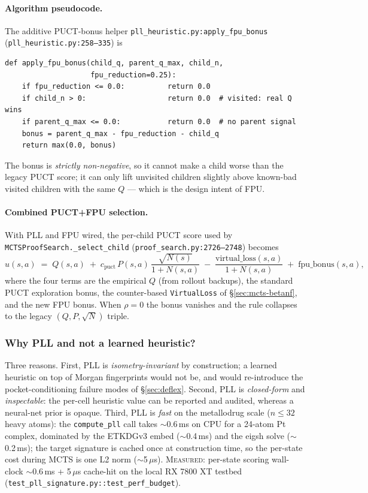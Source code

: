\paragraph{Algorithm pseudocode.}
The additive PUCT-bonus helper
\texttt{pll\_heuristic.py:apply\_fpu\_bonus}
(\texttt{pll\_heuristic.py:258--335}) is
\begin{verbatim}
def apply_fpu_bonus(child_q, parent_q_max, child_n,
                    fpu_reduction=0.25):
    if fpu_reduction <= 0.0:          return 0.0
    if child_n > 0:                   return 0.0  # visited: real Q wins
    if parent_q_max <= 0.0:           return 0.0  # no parent signal
    bonus = parent_q_max - fpu_reduction - child_q
    return max(0.0, bonus)
\end{verbatim}
The bonus is \emph{strictly non-negative}, so it cannot make
a child worse than the legacy PUCT score; it can only lift
unvisited children slightly above known-bad visited children
with the same $Q$ --- which is the design intent of FPU.

\paragraph{Combined PUCT+FPU selection.}
With PLL and FPU wired, the per-child PUCT score used by
\texttt{MCTSProofSearch.\_select\_child}
(\texttt{proof\_search.py:2726--2748}) becomes
\begin{equation}
  \label{eq:puct-fpu}
  u(s, a) \;=\; Q(s, a)
              \;+\; c_{\mathrm{puct}}\,
                  P(s, a)\,\frac{\sqrt{N(s)}}{1 + N(s, a)}
              \;-\; \frac{\mathrm{virtual\_loss}(s, a)}{1 + N(s, a)}
              \;+\; \mathrm{fpu\_bonus}(s, a),
\end{equation}
where the four terms are the empirical $Q$ (from rollout
backups), the standard PUCT exploration bonus, the
counter-based \texttt{VirtualLoss} of \S\ref{sec:mcts-betanf},
and the new FPU bonus.  When $\rho = 0$ the bonus vanishes
and the rule collapses to the legacy $(Q, P, \sqrt{N})$
triple.

\subsubsection{Why PLL and not a learned heuristic?}
\label{sec:pll-why}

Three reasons.  First, PLL is \emph{isometry-invariant} by
construction; a learned heuristic on top of Morgan fingerprints
would not be, and would re-introduce the pocket-conditioning
failure modes of \S\ref{sec:deflex}.  Second, PLL is
\emph{closed-form} and \emph{inspectable}: the per-cell
heuristic value can be reported and audited, whereas a
neural-net prior is opaque.  Third, PLL is \emph{fast} on the
metallodrug scale ($n \le 32$ heavy atoms): the
\texttt{compute\_pll} call takes $\sim$0.6\,ms on CPU for a
24-atom Pt complex, dominated by the ETKDGv3 embed
($\sim$0.4\,ms) and the eigsh solve ($\sim$0.2\,ms); the
target signature is cached once at construction time, so the
per-state cost during MCTS is one L2 norm ($\sim$5\,$\mu$s).
\textsc{Measured}: per-state scoring wall-clock
$\sim$0.6\,ms + 5\,$\mu$s cache-hit on the local RX 7800 XT
testbed (\texttt{test\_pll\_signature.py::test\_perf\_budget}).

